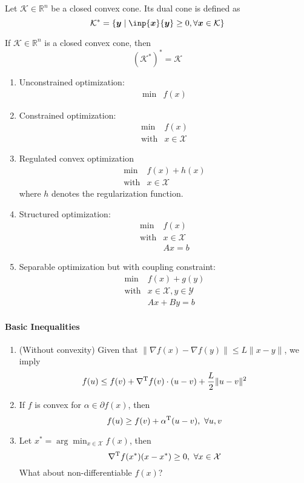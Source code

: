 \begin{definition}
Let $\mathcal{K}\in\mathbb{R}^n$ be a closed convex cone. Its dual cone is defined as
\[
\mathcal{K}^*=\{\bm y\mid\inp{\bm x}{\bm y}\ge0,\forall \bm x\in\mathcal{K}\}
\]
\end{definition}
\begin{theorem}
If $\mathcal{K}\in\mathbb{R}^n$ is a closed convex cone, then
\[
(\mathcal{K}^*)^*=\mathcal{K}
\]
\end{theorem}

\begin{enumerate}
\item
Unconstrained optimization:
\[
\begin{array}{ll}
\min&f(x)
\end{array}
\]
\item
Constrained optimization:
\[
\begin{array}{ll}
\min&f(x)\\
\text{with}&x\in\mathcal{X}
\end{array}
\]
\item
Regulated convex optimization
\[
\begin{array}{ll}
\min&f(x)+h(x)\\
\text{with}&x\in\mathcal{X}
\end{array}
\]
where $h$ denotes the regularization function.
\item
Structured optimization:
\[
\begin{array}{ll}
\min&f(x)\\
\text{with}&x\in\mathcal{X}\\
&Ax=b
\end{array}
\]
\item
Separable optimization but with coupling constraint:
\[
\begin{array}{ll}
\min&f(x)+g(y)\\
\text{with}&x\in\mathcal{X},y\in\mathcal{Y}\\
&Ax+By=b
\end{array}
\]
\end{enumerate}


\paragraph{Basic Inequalities}
\begin{enumerate}
\item
(Without convexity)
Given that $\|\nabla f(x) - \nabla f(y)\|\le L\|x-y\|$, we imply
\[
f(u)\le f(v)+\nabla^{\mathrm T} f(v)\cdot(u-v)+\frac{L}{2}\|u-v\|^2
\]
\item
If $f$ is convex for $\alpha\in\partial f(x)$, then
\[
f(u)\ge f(v)+\alpha\trans(u-v),\ \forall u,v
\]
\item
Let $x^*=\arg\min_{x\in\mathcal{X}}f(x)$, then
\[
\nabla\trans f(x^*)(x-x^*)\ge0,\ \forall x\in\mathcal{X}
\]
What about non-differentiable $f(x)$?
\end{enumerate}















